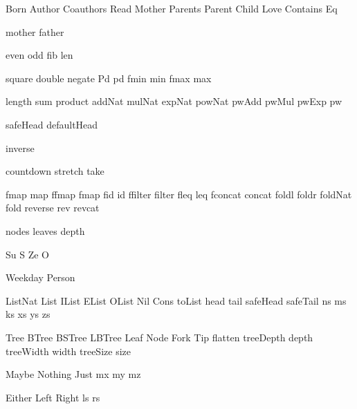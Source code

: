 
\DefRel Born
\DefRel Author
\DefRel Coauthors
\DefRel Read
\DefRel Mother
\DefRel Parents
\DefRel Parent
\DefRel Child
\DefRel Love
\DefRel Contains
\DefRel Eq

\DefFun mother
\DefFun father

\DefFun even
\DefFun odd
\DefFun fib
\DefFun len

\DefFpf square
\DefFpf double
\DefFpf negate
\DefFPF Pd pd
\DefFPF fmin   min
\DefFPF fmax   max

\DefFpf length
\DefFpf sum
\DefFpf product
\DefFpf addNat
\DefFpf mulNat
\DefFpf expNat
\DefFpf powNat
\DefFpf pwAdd
\DefFpf pwMul
\DefFpf pwExp
\DefFpf pw

\DefFpf safeHead
\DefFpf defaultHead

\DefFpf inverse

\DefFpf countdown
\DefFpf stretch
\DefFpf take

\DefFPF fmap     map
\DefFPF ffmap    fmap
\DefFPF fid      id
\DefFPF ffilter  filter
\DefFPF fleq     leq
\DefFPF fconcat  concat
\DefFpf foldl
\DefFpf foldr
\DefFpf foldNat
\DefFpf fold
\DefFpf reverse
\DefFpf rev
\DefFpf revcat

\DefFpf nodes
\DefFpf leaves
\DefFpf depth

\DefCONS Su S
\DefCONS Ze O

\DefType Weekday
\DefType Person

\DefType ListNat
\DefType List
\DefType IList
\DefType EList
\DefType OList
\DefCons Nil
\DefCons Cons
\DefFpf  toList
\DefFpf  head
\DefFpf  tail
\DefFpf  safeHead
\DefFpf  safeTail
\DefVar  ns
\DefVar  ms
\DefVar  ks
\DefVar  xs
\DefVar  ys
\DefVar  zs

\DefType Tree
\DefType BTree
\DefType BSTree
\DefType LBTree
\DefCons Leaf
\DefCons Node
\DefCons Fork
\DefCons Tip
\DefFpf  flatten
\DefFPF  treeDepth  depth
\DefFPF  treeWidth  width
\DefFPF  treeSize   size

\DefType Maybe
\DefCons Nothing
\DefCons Just
\DefVar  mx
\DefVar  my
\DefVar  mz

\DefType Either
\DefCons Left
\DefCons Right
\DefVar  ls
\DefVar  rs

\def\bla{\mathrm{bla}}
\def\blu{\mathrm{blu}}

\def\persons{{\cal P}}
\let\pers=\persons

\def\euclid{\algorithmstylize{Euclid}}%

\def\Smile{\rel{\woohoo}}
\def\Frown{\rel{\boohoo}}

\def\oddAs#1{A_{[#1]}}

